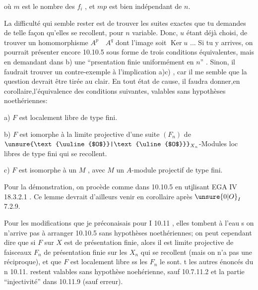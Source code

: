où $m$ est le nombre des $f_i$ , et $mp$ est bien indépendant de $n$.

La difficulté qui  semble rester est de trouver les suites exactes que tu demandes de telle façon qu'elles se recollent, pour $n$ variable. Donc, $u$ étant déjà choisi, de trouver un homomorphisme $A^p\quad A^q$  dont l'image soit $\operatorname{Ker}u$ ... Si tu y arrives, on pourrait présenter encore 10.10.5 sous forme de trois conditions équivalentes, mais en demandant dans b) une ``prsentation finie uniformément en $n$'' . Sinon, il faudrait trouver un contre-exemple à  l'implication a)\quad c) , car il me semble que la question devrait être tirée au clair. En tout état de cause, il faudra donner,en corollaire,l'équivalence des conditions suivantes, valables sans hypothèses noethériennes:

a) $F$ est localement libre de type fini.

b) $F$ est iomorphe à la limite projective d'une suite $(F_n)$ de $\unsure{\text{\uuline{$O$}}|\text{\uline{$O$}}}_{X_n}$-Modules loc libres de type fini qui se recollent.

c) $F$ est isomorphe à un $M$ , avec $M$ un $A$-module projectif de type fini.

Pour la démonstration, on procède comme dans 10.10.5 en ut\uline{i}lisant EGA IV 18.3.2.1 . Ce lemme devrait d'ailleurs venir en corollaire  après $\unsure{0|O}_I$ 7.2.9.

Pour les modifications que je préconaisais pour I 10.11 , elles tombent à l'eau s on n'arrive pas à arranger 10.10.5 sans hypothèses noethériennes; on peut cependant dire que si $F$ sur $X$ est de présentation finie, alors il est limite projective de faisceaux $F_n$ de présentation finie sur les $X_n$ qui se recollent (mais on n'a pas une réciproque), et que $F$ est localement libre ss les $F_n$ le sont. t  les autres énoncés du n 10.11. restent valables sans hypothèse noehérienne, sauf 10.7.11.2 et la partie ``injectivité'' dans 10.11.9 (sauf erreur).
